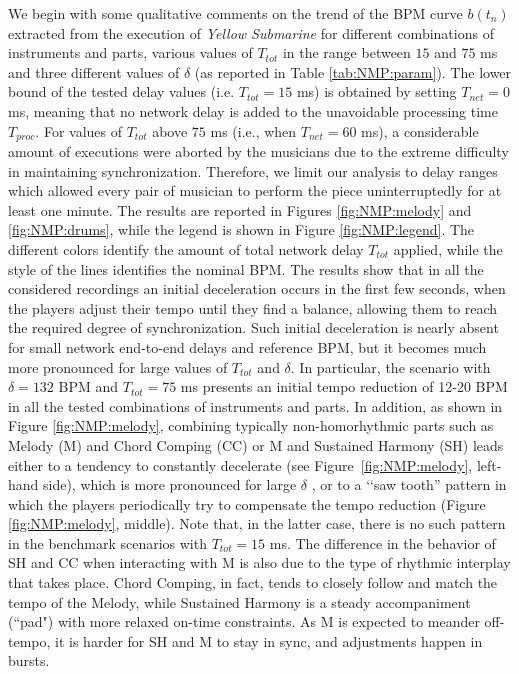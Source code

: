 We begin with some qualitative comments on the trend of the BPM curve $b(t_n)$ extracted from %
the execution of \textit{ Yellow Submarine} for different combinations of instruments and parts, various values of $T_{tot}$ in the range between $15$ and $75$ ms and three different values of $\delta$ (as reported in Table \ref{tab:NMP:param}). The lower bound of the tested delay values (i.e. $T_{tot}=15$ ms) is obtained by setting $T_{net}=0$ ms, meaning that no network delay is added to the unavoidable processing time $T_{proc}$. For values of $T_{tot}$ above $75$ ms (i.e., when $T_{net}=60$ ms), a considerable amount of executions were aborted by the musicians due to the extreme difficulty in maintaining synchronization. Therefore, we limit our analysis to delay ranges which allowed every pair of musician to perform the piece uninterruptedly for at least one minute.
The results are reported in Figures \ref{fig:NMP:melody} and \ref{fig:NMP:drums}, while the legend is shown in Figure  \ref{fig:NMP:legend}. The different colors identify the amount of total network delay $T_{tot}$ applied, while the style of the lines identifies the nominal BPM. The results show that in all the considered recordings an initial deceleration occurs in the first few seconds, when the players adjust their tempo until they find a balance, allowing them to reach the required degree of synchronization. Such initial deceleration is nearly absent for small network end-to-end delays and reference BPM, but it becomes much more pronounced for large values of $T_{tot}$ and $\delta$. In particular, the scenario with $\delta=132$ BPM and $T_{tot}=75$ ms presents an initial tempo reduction of 12-20 BPM in all the tested combinations of instruments and parts.
In addition, as shown in Figure \ref{fig:NMP:melody}, combining typically non-homorhythmic parts such as Melody (M) and Chord Comping (CC) or M and Sustained Harmony (SH) leads either to a tendency to constantly decelerate (see Figure~\ref{fig:NMP:melody}, left-hand side), which is more pronounced for large $\delta$ , or to a \lq\lq saw tooth'' pattern in which the players periodically try to compensate the tempo reduction (Figure \ref{fig:NMP:melody}, middle). Note that, in the latter case, there is no such pattern in the benchmark scenarios with $T_{tot}=15$ ms. The difference in the behavior of SH and CC when interacting with M is also due to the type of rhythmic interplay that takes place. Chord Comping, in fact, tends to closely follow and match the tempo of the Melody, while Sustained Harmony is a steady accompaniment (``pad") with more relaxed on-time constraints. As M is expected to meander off-tempo, it is harder for SH and M to stay in sync, and adjustments happen in bursts.


